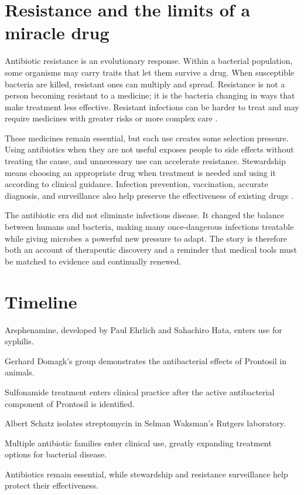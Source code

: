 \documentclass[12pt,oneside]{book}
\begin{document}
\section{Resistance and the limits of a miracle drug}
Antibiotic resistance is an evolutionary response. Within a bacterial
population, some organisms may carry traits that let them survive a drug.
When susceptible bacteria are killed, resistant ones can multiply and
spread. Resistance is not a person becoming resistant to a medicine; it is
the bacteria changing in ways that make treatment less effective. Resistant
infections can be harder to treat and may require medicines with greater
risks or more complex care \cite{antibioticEraReview,cdcAntibioticUse}.

These medicines remain essential, but each use creates some selection
pressure. Using antibiotics when they are not useful exposes people to side
effects without treating the cause, and unnecessary use can accelerate
resistance. Stewardship means choosing an appropriate drug when treatment is
needed and using it according to clinical guidance. Infection prevention,
vaccination, accurate diagnosis, and surveillance also help preserve the
effectiveness of existing drugs \cite{cdcAntibioticUse}.

The antibiotic era did not eliminate infectious disease. It changed the
balance between humans and bacteria, making many once-dangerous infections
treatable while giving microbes a powerful new pressure to adapt. The story
is therefore both an account of therapeutic discovery and a reminder that
medical tools must be matched to evidence and continually renewed.

\section*{Timeline}
\begin{description}[leftmargin=2.3cm,style=nextline]
  \item[1910] Arsphenamine, developed by Paul Ehrlich and Sahachiro Hata, enters use for syphilis.
  \item[1932] Gerhard Domagk's group demonstrates the antibacterial effects of Prontosil in animals.
  \item[1935] Sulfonamide treatment enters clinical practice after the active antibacterial component of Prontosil is identified.
  \item[1943] Albert Schatz isolates streptomycin in Selman Waksman's Rutgers laboratory.
  \item[1940s--1960s] Multiple antibiotic families enter clinical use, greatly expanding treatment options for bacterial disease.
  \item[Today] Antibiotics remain essential, while stewardship and resistance surveillance help protect their effectiveness.
\end{description}
\end{document}
